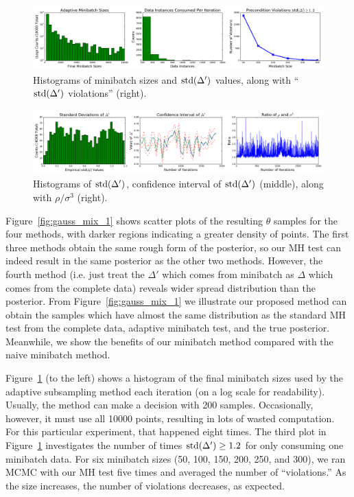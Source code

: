\documentclass{article}
\begin{document}
\begin{figure}[t]
    \centering
    \includegraphics[width=1\linewidth]{adaptive_and_ours_information_v01.png}
    \caption{
    Histograms of minibatch sizes and ${\rm std}(\Delta')$ values, along with ``${\rm std}(\Delta')$
    violations'' (right).
    }
    \label{fig:gauss_mix_2}
\end{figure}

\begin{figure}[t]
    \centering
    \includegraphics[width=1\linewidth]{CI_v01.png}
    \caption{
    Histograms of ${\rm std}(\Delta')$, confidence interval of ${\rm std}(\Delta')$ (middle), along with $\rho / \sigma^3$ (right).
    }
    \label{fig:gauss_mix_3}
\end{figure}

Figure~\ref{fig:gauss_mix_1} shows scatter plots of the resulting $\theta$ samples for the four
methods, with darker regions indicating a greater density of points. The first three methods obtain the
same rough form of the posterior, so our MH test can indeed result in the same posterior as the
other two methods. However, the fourth method (i.e. just treat the $\Delta'$ which comes from minibatch as $\Delta$ which comes from the complete data) reveals wider spread distribution than the posterior. From Figure~\ref{fig:gauss_mix_1} we illustrate our proposed method can obtain the samples which have almost the same distribution as the standard MH test from the complete data, adaptive minibatch test, and the true posterior. Meanwhile, we show the benefits of our minibatch method compared with the naive minibatch method.  

Figure~\ref{fig:gauss_mix_2} (to the left) shows a histogram of the final minibatch sizes used by
the adaptive subsampling method each iteration (on a log scale for readability).  Usually, the method
can make a decision with 200 samples. Occasionally, however, it must use all 10000 points, resulting
in lots of wasted computation.  For this particular experiment, that happened eight times.
The third plot in Figure~\ref{fig:gauss_mix_2} investigates the number of times ${\rm std}(\Delta')
\ge 1.2$ for only consuming one minibatch data. For six minibatch sizes (50, 100, 150, 200, 250, and 300), we ran MCMC with
our MH test five times and averaged the number of ``violations.'' As the size increases, the
number of violations decreases, as expected.
\end{document}
